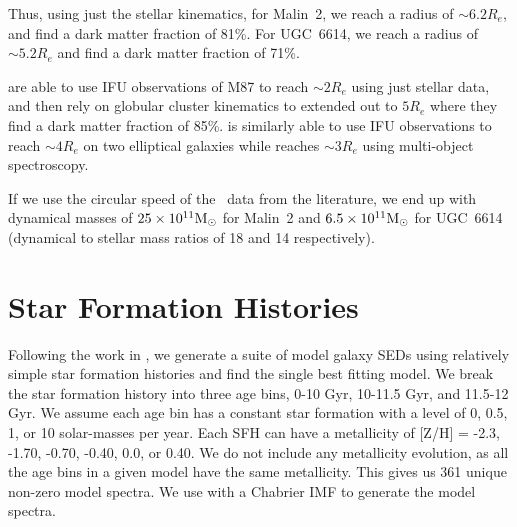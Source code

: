 \documentclass{emulateapj}
\def\arcsec{$^{\prime\prime}$}
\newcommand\msun{\rm{M}_\odot}
\newcommand\HI{\ion{H}{1}}
\begin{document}
Thus, using just the stellar kinematics, for Malin~2, we reach a radius of $\sim 6.2 R_e$, and find a dark matter fraction of 81\%.  For UGC~6614, we reach a radius of  $\sim 5.2 R_e$ and find a dark matter fraction of 71\%.  

\citet{Murphy2011} are able to use IFU observations of M87 to reach $\sim2 R_e$ using just stellar data, and then rely on globular cluster kinematics to extended out to $5 R_e$ where they find a dark matter fraction of 85\%.  \citet{Weij09} is similarly able to use IFU observations to reach $\sim 4 R_e$ on two elliptical galaxies while \citet{Proctor09} reaches $\sim 3 R_e$ using multi-object spectroscopy.  


If we use the circular speed of the \HI\ data from the literature, we end up with dynamical masses of $25\times 10^{11} \msun$ for Malin~2 and $6.5\times 10^{11} \msun$ for UGC~6614 (dynamical to stellar mass ratios of 18 and 14 respectively).   %








\section{Star Formation Histories}\label{sec:sfh}

Following the work in \citet{Yoachim10,Yoachim12}, we generate a suite of model galaxy SEDs using relatively simple star formation histories and find the single best fitting model.  We break the star formation history into three age bins, 0-10 Gyr, 10-11.5 Gyr, and 11.5-12 Gyr.  We assume each age bin has a constant star formation with a level of 0, 0.5, 1, or 10 solar-masses per year.  Each SFH can have a metallicity of [Z/H] = -2.3, -1.70, -0.70, -0.40, 0.0, or 0.40.  We do not include any metallicity evolution, as all the age bins in a given model have the same metallicity.  This gives us 361 unique non-zero model spectra. We use \citet{Bruzual03} with a Chabrier IMF to generate the model spectra. 
  
\end{document}
